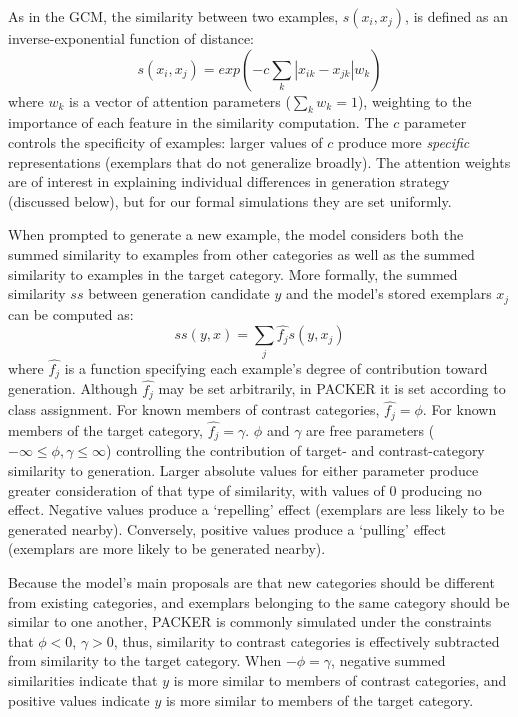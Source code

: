 \documentclass[10pt,letterpaper]{article}
\begin{document}
As in the GCM, the similarity between two examples, $s(x_i, x_j)$, is defined as an inverse-exponential function of distance:
\begin{equation}
  s(x_i,x_j) = exp( -c \sum_{k}{|x_{ik} - x_{jk}|}w_k ) 
\end{equation}
where $w_k$ is a vector of attention parameters ($\sum_k{w_k} = 1$), weighting to the importance of each feature in the similarity computation. The $c$ parameter controls the specificity of examples: larger values of $c$ produce more \textit{specific} representations (exemplars that do not generalize broadly). The attention weights are of interest in explaining individual differences in generation strategy (discussed below), but for our formal simulations they are set uniformly.

When prompted to generate a new example, the model considers both the summed similarity to examples from other categories as well as the summed similarity to examples in the target category. More formally, the summed similarity $ss$ between generation candidate $y$ and the model's stored exemplars $x_j$ can be computed as:
\begin{equation}
  ss(y, x) = \sum_j{\hat{f_j} s(y, x_j)}
\end{equation}
where $\hat{f_j}$ is a function specifying each example's degree of contribution toward generation. Although $\hat{f_j}$ may be set arbitrarily, in PACKER it is set according to class assignment. For known members of contrast categories, $\hat{f_j} = \phi$. For known members of the target category, $\hat{f_j} = \gamma$. $\phi$ and $\gamma$ are free parameters ($-\infty \leq \phi, \gamma \leq \infty$) controlling the contribution of target- and contrast-category similarity to generation. Larger absolute values for either parameter produce greater consideration of that type of similarity, with values of 0 producing no effect. Negative values produce a `repelling' effect (exemplars are less likely to be generated nearby). Conversely, positive values produce a `pulling' effect (exemplars are more likely to be generated nearby). 

Because the model's main proposals are that new categories should be different from existing categories, and exemplars belonging to the same category should be similar to one another, PACKER is commonly simulated under the constraints that $\phi < 0$, $\gamma > 0$, thus, similarity to contrast categories is effectively subtracted from similarity to the target category. When $-\phi = \gamma$, negative summed similarities indicate that $y$ is more similar to members of contrast categories, and positive values indicate $y$ is more similar to members of the target category.
\end{document}
